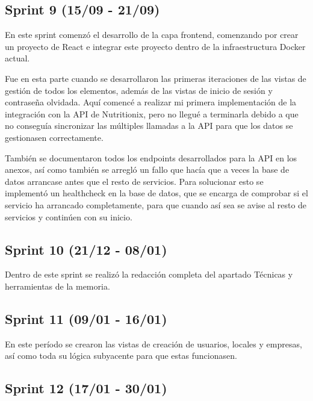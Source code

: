 
\subsection{Sprint 9 (15/09 - 21/09)}

En este sprint comenzó el desarrollo de la capa frontend, comenzando por crear un proyecto de React e integrar este proyecto dentro de la infraestructura Docker actual.

Fue en esta parte cuando se desarrollaron las primeras iteraciones de las vistas de gestión de todos los elementos, además de las vistas de inicio de sesión y contraseña olvidada. Aquí comencé a realizar mi primera implementación de la integración con la API de Nutritionix, pero no llegué a terminarla debido a que no conseguía sincronizar las múltiples llamadas a la API para que los datos se gestionasen correctamente.

También se documentaron todos los endpoints desarrollados para la API en los anexos, así como también se arregló un fallo que hacía que a veces la base de datos arrancase antes que el resto de servicios. Para solucionar esto se implementó un healthcheck en la base de datos, que se encarga de comprobar si el servicio ha arrancado completamente, para que cuando así sea se avise al resto de servicios y continúen con su inicio.


\subsection{Sprint 10 (21/12 - 08/01)}

Dentro de este sprint se realizó la redacción completa del apartado Técnicas y herramientas de la memoria.


\subsection{Sprint 11 (09/01 - 16/01)}

En este período se crearon las vistas de creación de usuarios, locales y empresas, así como toda su lógica subyacente para que estas funcionasen.


\subsection{Sprint 12 (17/01 - 30/01)}

